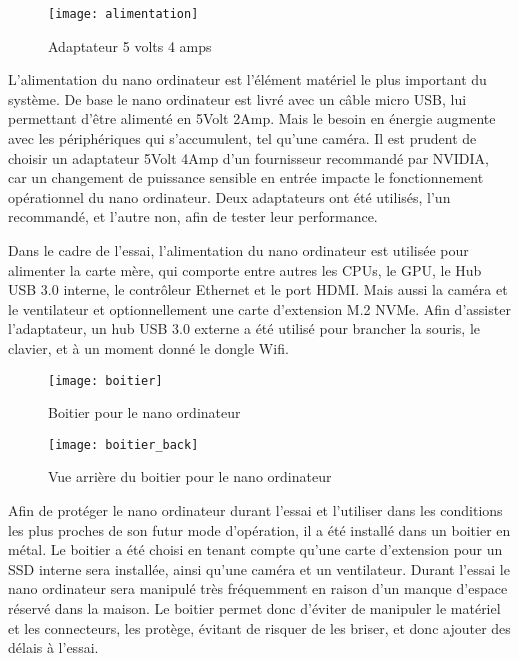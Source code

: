 \begin{figure}[H]
    \centering
    \texttt{[image: alimentation]}
    \caption{Adaptateur 5 volts 4 amps}
    \label{fig:alimenation}
\end{figure}
\par L'alimentation du nano ordinateur est l'élément matériel le plus important du système. De base le nano ordinateur est livré avec un câble micro USB, lui permettant d'être alimenté en 5Volt 2Amp. Mais le besoin en énergie augmente avec les périphériques qui s'accumulent, tel qu'une caméra. Il est prudent de choisir un adaptateur 5Volt 4Amp d'un fournisseur recommandé par NVIDIA, car un changement de puissance sensible en entrée impacte le fonctionnement opérationnel du nano ordinateur. Deux adaptateurs ont été utilisés, l'un recommandé, et l'autre non, afin de tester leur performance. 
\par Dans le cadre de l'essai, l'alimentation du nano ordinateur est utilisée pour alimenter la carte mère, qui comporte entre autres les CPUs, le GPU, le Hub USB 3.0 interne, le contrôleur Ethernet et le port HDMI. Mais aussi la caméra et  le ventilateur et optionnellement une carte d'extension M.2 NVMe. Afin d'assister l'adaptateur, un hub USB 3.0 externe a été utilisé pour brancher la souris, le clavier, et à un moment donné le dongle Wifi.
\begin{figure}[H]
    \centering
    \texttt{[image: boitier]}
    \caption{Boitier pour le nano ordinateur}
    \label{fig:boitier}
\end{figure}
\begin{figure}[H]
    \centering
    \texttt{[image: boitier\_back]}
    \caption{Vue arrière du boitier pour le nano ordinateur}
    \label{fig:boitier_arriere}
\end{figure}
\par Afin de protéger le nano ordinateur durant l'essai et l'utiliser dans les conditions les plus proches de son futur mode d'opération, il a été installé dans un boitier en métal. Le boitier a été choisi en tenant compte qu'une carte d'extension pour un SSD interne sera installée, ainsi qu'une caméra et un ventilateur. Durant l'essai le nano ordinateur sera manipulé très fréquemment en raison d'un manque d'espace réservé dans la maison. Le boitier permet donc d'éviter de manipuler le matériel et les connecteurs, les protège, évitant de risquer de les briser, et donc ajouter des délais à l'essai. 
